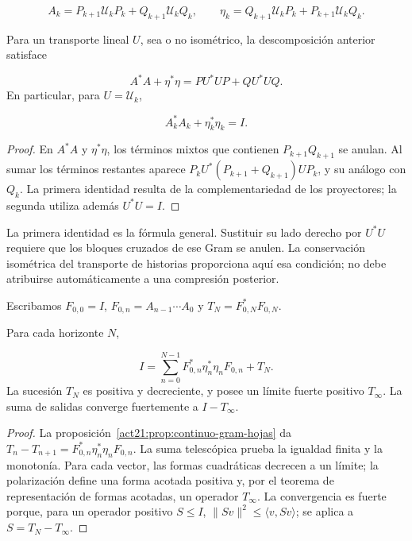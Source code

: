 \[
A_k=P_{k+1}\mathcal U_kP_k+Q_{k+1}\mathcal U_kQ_k,
\qquad
\eta_k=Q_{k+1}\mathcal U_kP_k+P_{k+1}\mathcal U_kQ_k.
\]
\begin{proposition}
\label{act21:prop:continuo-gram-hojas}
Para un transporte lineal \(U\), sea o no isométrico, la descomposición anterior satisface

\[
A^*A+\eta^*\eta=PU^*UP+QU^*UQ.
\]
En particular, para \(U=\mathcal U_k\),

\[
A_k^*A_k+\eta_k^*\eta_k=I.
\]
\end{proposition}
\begin{proof}
En \(A^*A\) y \(\eta^*\eta\), los términos mixtos que contienen \(P_{k+1}Q_{k+1}\) se anulan. Al sumar los términos restantes aparece \(P_kU^*(P_{k+1}+Q_{k+1})UP_k\), y su análogo con \(Q_k\). La primera identidad resulta de la complementariedad de los proyectores; la segunda utiliza además \(U^*U=I\).
\end{proof}

La primera identidad es la fórmula general. Sustituir su lado derecho por \(U^*U\) requiere que los bloques cruzados de ese Gram se anulen. La conservación isométrica del transporte de historias proporciona aquí esa condición; no debe atribuirse automáticamente a una compresión posterior.

Escribamos \(F_{0,0}=I\), \(F_{0,n}=A_{n-1}\cdots A_0\) y \(T_N=F_{0,N}^*F_{0,N}\).

\begin{theorem}
\label{act21:thm:continuo-descomposicion-terminal}
Para cada horizonte \(N\),

\[
I=\sum_{n=0}^{N-1}
F_{0,n}^*\eta_n^*\eta_nF_{0,n}+T_N.
\]
La sucesión \(T_N\) es positiva y decreciente, y posee un límite fuerte positivo \(T_\infty\). La suma de salidas converge fuertemente a \(I-T_\infty\).
\end{theorem}
\begin{proof}
La proposición~\ref{act21:prop:continuo-gram-hojas} da \(T_n-T_{n+1}=F_{0,n}^*\eta_n^*\eta_nF_{0,n}\). La suma telescópica prueba la igualdad finita y la monotonía. Para cada vector, las formas cuadráticas decrecen a un límite; la polarización define una forma acotada positiva y, por el teorema de representación de formas acotadas, un operador \(T_\infty\). La convergencia es fuerte porque, para un operador positivo \(S\leq I\), \(\|Sv\|^2\leq\langle v,Sv\rangle\); se aplica a \(S=T_N-T_\infty\).
\end{proof}

